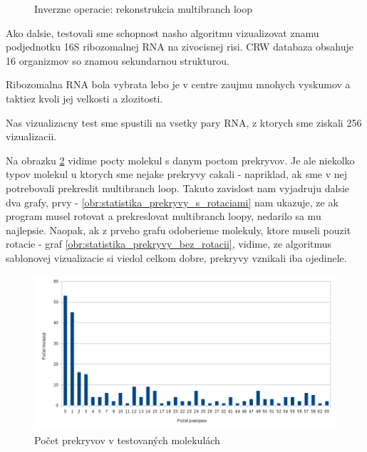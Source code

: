 \begin{figure}[H]
\begin{subfigure}{0.3\textwidth}
  \end{subfigure}
  \caption{Inverzne operacie: rekonstrukcia multibranch loop}
  \label{obr:delete_insert_multibranch_loop}
\end{figure}


Ako dalsie, testovali sme schopnost nasho algoritmu vizualizovat znamu podjednotku 16S ribozomalnej RNA
na zivocisnej risi. CRW databaza obsahuje 16 organizmov so znamou sekundarnou strukturou.

Ribozomalna RNA bola vybrata lebo je v centre zaujmu mnohych vyskumov a taktiez kvoli jej velkosti
a zlozitosti.

Nas vizualizacny test sme spustili na vsetky pary RNA, z ktorych sme ziskali 256 vizualizacii.


Na obrazku \ref{obr:statistika_prekryvy} vidime pocty molekul s danym poctom prekryvov. 
Je ale niekolko typov molekul u ktorych sme nejake prekryvy cakali - napriklad, ak sme v nej
potrebovali prekreslit multibranch loop. Takuto zavislost nam vyjadruju dalsie dva grafy,
prvy - \ref{obr:statistika_prekryvy_s_rotaciami} nam ukazuje, ze ak program musel rotovat
a prekreslovat multibranch loopy, nedarilo sa mu najlepsie. Naopak, ak z prveho grafu
odoberieme molekuly, ktore museli pouzit rotacie - graf \ref{obr:statistika_prekryvy_bez_rotacii},
vidime, ze algoritmus sablonovej vizualizacie si viedol celkom dobre, prekryvy vznikali iba ojedinele.


\begin{figure}
  \includegraphics[width=1\textwidth]{../img/statistika/prekryvy-pocetmolekul}
  \caption{Počet prekryvov v testovaných molekulách}
  \label{obr:statistika_prekryvy}
\end{figure}


